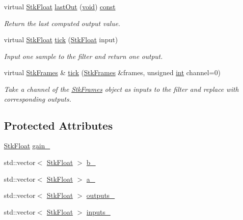 \begin{DoxyCompactItemize}
virtual \hyperlink{namespace_nyq_a044fa20a706520a617bbbf458a7db7e4}{Stk\+Float} \hyperlink{class_nyq_1_1_filter_a1e473e116f552da06086787a66a4460c}{last\+Out} (\hyperlink{sound_8c_ae35f5844602719cf66324f4de2a658b3}{void}) \hyperlink{getopt1_8c_a2c212835823e3c54a8ab6d95c652660e}{const} 
\begin{DoxyCompactList}\small\item\em Return the last computed output value. \end{DoxyCompactList}\item 
virtual \hyperlink{namespace_nyq_a044fa20a706520a617bbbf458a7db7e4}{Stk\+Float} \hyperlink{class_nyq_1_1_filter_af934064ea1573bc547a0bbdf76395036}{tick} (\hyperlink{namespace_nyq_a044fa20a706520a617bbbf458a7db7e4}{Stk\+Float} input)
\begin{DoxyCompactList}\small\item\em Input one sample to the filter and return one output. \end{DoxyCompactList}\item 
virtual \hyperlink{class_nyq_1_1_stk_frames}{Stk\+Frames} \& \hyperlink{class_nyq_1_1_filter_ab4ae4f8ac8794885189d3970f6561485}{tick} (\hyperlink{class_nyq_1_1_stk_frames}{Stk\+Frames} \&frames, unsigned \hyperlink{xmltok_8h_a5a0d4a5641ce434f1d23533f2b2e6653}{int} channel=0)
\begin{DoxyCompactList}\small\item\em Take a channel of the \hyperlink{class_nyq_1_1_stk_frames}{Stk\+Frames} object as inputs to the filter and replace with corresponding outputs. \end{DoxyCompactList}\end{DoxyCompactItemize}
\subsection*{Protected Attributes}
\begin{DoxyCompactItemize}
\item 
\hyperlink{namespace_nyq_a044fa20a706520a617bbbf458a7db7e4}{Stk\+Float} \hyperlink{class_nyq_1_1_filter_afc2d4c6c45ae1287c05a450ee376035b}{gain\+\_\+}
\item 
std\+::vector$<$ \hyperlink{namespace_nyq_a044fa20a706520a617bbbf458a7db7e4}{Stk\+Float} $>$ \hyperlink{class_nyq_1_1_filter_a50e3f46dac0fe36e42fd35b944031ccb}{b\+\_\+}
\item 
std\+::vector$<$ \hyperlink{namespace_nyq_a044fa20a706520a617bbbf458a7db7e4}{Stk\+Float} $>$ \hyperlink{class_nyq_1_1_filter_a5b5dc76bc37e05f5d69aeb08c7a15697}{a\+\_\+}
\item 
std\+::vector$<$ \hyperlink{namespace_nyq_a044fa20a706520a617bbbf458a7db7e4}{Stk\+Float} $>$ \hyperlink{class_nyq_1_1_filter_a82766e0a2ec5589c5dfb828a34091d7d}{outputs\+\_\+}
\item 
std\+::vector$<$ \hyperlink{namespace_nyq_a044fa20a706520a617bbbf458a7db7e4}{Stk\+Float} $>$ \hyperlink{class_nyq_1_1_filter_ab0bdd1670dfdae6f3311f8f44049ca09}{inputs\+\_\+}
\end{DoxyCompactItemize}
